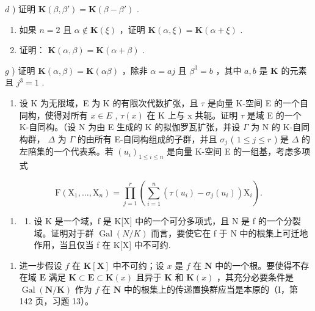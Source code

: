 \(d\) ) 证明 \(\mathbf{K}(\beta, \beta') = \mathbf{K}(\beta - \beta')\) .

\begin{enumerate}
\def\labelenumi{\alph{enumi})}
\setcounter{enumi}{4}
\item
  如果 \(n = 2\) 且 \(\alpha \notin \mathbf{K}(\xi)\) ，证明 \(\mathbf{K}(\alpha, \xi) = \mathbf{K}(\alpha + \xi)\) .
\item
  证明： \(\mathbf{K}(\alpha, \beta) = \mathbf{K}(\alpha + \beta)\) .
\end{enumerate}

\(g\) ) 证明 \(\mathbf{K}(\alpha ,\beta) = \mathbf{K}(\alpha \beta)\) ，除非 \(\alpha = aj\) 且 \(\beta^3 = b\) ，其中 \(a,b\) 是 \(\mathbf{K}\) 的元素且 \(j^3 = 1\) .

\begin{enumerate}
\def\labelenumi{\arabic{enumi})}
\setcounter{enumi}{7}
\tightlist
\item
  设 K 为无限域，E 为 K 的有限次代数扩张，且 \(\tau\) 是向量 K-空间 E 的一个自同构，使得对所有 \(x \in E\) , \(\tau(x)\) 在 K 上与 x 共轭。证明 \(\tau\) 是域 E 的一个 K-自同构。（设 N 为由 E 生成的 K 的拟伽罗瓦扩张，并设 \(\Gamma\) 为 N 的 K-自同构群， \(\Delta\) 为 \(\Gamma\) 的由所有 E-自同构组成的子群，并且 \(\sigma_{j}\) ( \(1 \leqslant j \leqslant r\) ) 是 \(\Delta\) 的左陪集的一个代表系。若 \((u_{i})_{1 \leqslant i \leqslant n}\) 是向量 K-空间 E 的一组基，考虑多项式
\end{enumerate}

\[
\mathrm{F} \left(\mathrm{X} _ {1}, \dots , \mathrm{X} _ {n}\right) = \prod_ {j = 1} ^ {r} \left(\sum_ {i = 1} ^ {n} \left(\tau \left(u _ {i}\right) - \sigma_ {j} \left(u _ {i}\right)\right) \mathrm{X} _ {i}\right).
\]

\BourbakiExerciseGroup

\begin{enumerate}
\def\labelenumi{\arabic{enumi})}
\tightlist
\item
  \begin{enumerate}
  \def\labelenumii{\alph{enumii})}
  \tightlist
  \item
    设 K 是一个域，f 是 K{[}X{]} 中的一个可分多项式，且 N 是 f 的一个分裂域。证明对于群 \(\operatorname{Gal}(N/K)\) 而言，要使它在 f 于 N 中的根集上可迁地作用，当且仅当 f 在 K{[}X{]} 中不可约.
  \end{enumerate}
\end{enumerate}

\begin{enumerate}
\def\labelenumi{\alph{enumi})}
\setcounter{enumi}{1}
\tightlist
\item
  进一步假设 \(f\) 在 \(\mathbf{K}[\mathbf{X}]\) 中不可约；设 \(x\) 是 \(f\) 在 \(\mathbf{N}\) 中的一个根。要使得不存在域 \(\mathbf{E}\) 满足 \(\mathbf{K} \subset \mathbf{E} \subset \mathbf{K}(x)\) 且异于 \(\mathbf{K}\) 和 \(\mathbf{K}(x)\) ，其充分必要条件是 \(\operatorname{Gal}(\mathbf{N} / \mathbf{K})\) 作为 \(f\) 在 \(\mathbf{N}\) 中的根集上的传递置换群应当是本原的（I，第 142 页，习题 13）。
\end{enumerate}

